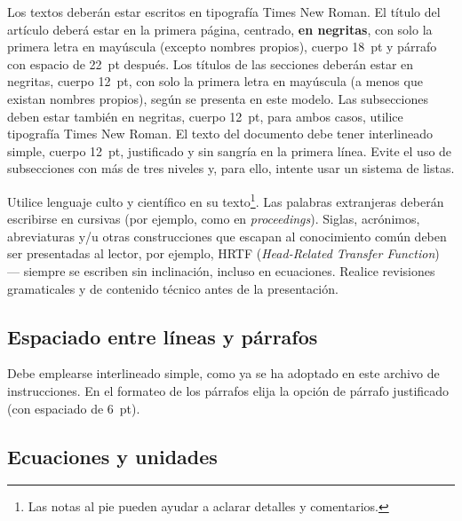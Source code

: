 Los textos deberán estar escritos en tipografía Times New Roman. El título del artículo deberá estar en la primera página, centrado, \textbf{en negritas}, con solo la primera letra en mayúscula (excepto nombres propios), cuerpo 18~pt y párrafo con espacio de 22~pt después. Los títulos de las secciones deberán estar en negritas, cuerpo 12~pt, con solo la primera letra en mayúscula (a menos que existan nombres propios), según se presenta en este modelo. Las subsecciones deben estar también en negritas, cuerpo 12~pt, para ambos casos, utilice tipografía Times New Roman. El texto del documento debe tener interlineado simple, cuerpo 12~pt, justificado y sin sangría en la primera línea. Evite el uso de subsecciones con más de tres niveles y, para ello, intente usar un sistema de listas.


Utilice lenguaje culto y científico en su texto\footnote{Las notas al pie pueden ayudar a aclarar detalles y comentarios.}. Las palabras extranjeras deberán escribirse en cursivas (por ejemplo, como en \textit{proceedings}). Siglas, acrónimos, abreviaturas y/u otras construcciones que escapan al conocimiento común deben ser presentadas al lector, por ejemplo, HRTF (\textit{Head-Related Transfer Function}) --- siempre se escriben sin inclinación, incluso en ecuaciones. Realice revisiones gramaticales y de contenido técnico antes de la presentación.

\subsection{Espaciado entre líneas y párrafos}

Debe emplearse interlineado simple, como ya se ha adoptado en este archivo de instrucciones.
En el formateo de los párrafos elija la opción de párrafo justificado (con espaciado de 6~pt).


\subsection{Ecuaciones y unidades}

